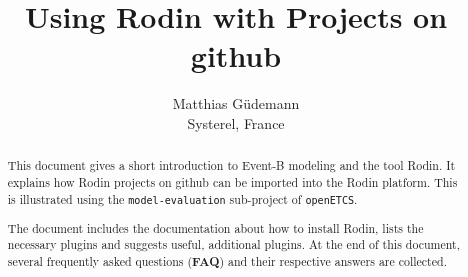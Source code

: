 \documentclass{template/openetcs_article}
\begin{document}
\frontmatter
{}






\newcommand{\true}{\ensuremath{true}}
\newcommand{\btext}[1]{{\it #1}}
\newcommand{\bvar}[1]{\btext{#1}}
\newcommand{\bevent}[1]{\btext{#1}}
\newcommand{\binv}[1]{\btext{#1}}
\newcommand{\bconst}[1]{\btext{#1}}
\newcommand{\bparam}[1]{\btext{#1}}
\newcommand{\bfunc}[1]{\btext{#1}}
\newcommand{\baxiom}[1]{\btext{#1}}
\newcommand{\btype}[1]{\btext{#1}}
\newcommand{\bguard}[1]{\btext{#1}}


\newcommand{\skalierung}{.6}

\title{Using Rodin with Projects on github}

\author{Matthias Güdemann\\Systerel, France}







\maketitle
\tableofcontents
\listoffiguresandtables
\newpage

\begin{abstract}
  This document gives a short introduction to Event-B modeling and the tool
  Rodin. It explains how Rodin projects on github can be imported into the Rodin
  platform. This is illustrated using the \texttt{model-evaluation} sub-project
  of \texttt{openETCS}.

  The document includes the documentation about how to install Rodin, lists the
  necessary plugins and suggests useful, additional plugins. At the end of this
  document, several frequently asked questions ({\bf FAQ}) and their respective
  answers are collected.
\end{abstract}
\end{document}
